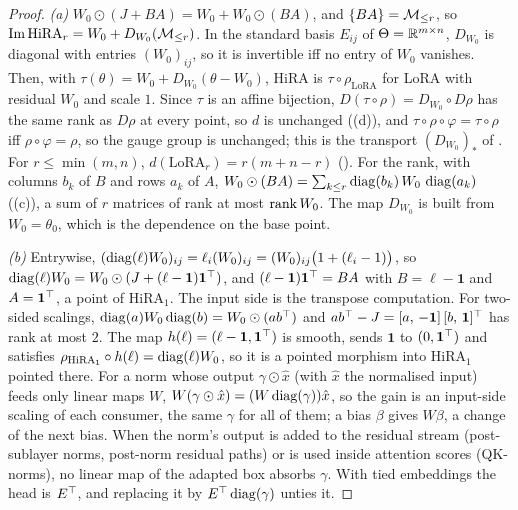 \begin{proof}
\emph{(a)} $W_0\odot(J+BA)=W_0+W_0\odot(BA)$, and $\{BA\}=\mathcal{M}_{\le r}$, so $\operatorname{Im}\mathrm{HiRA}_r=W_0+D_{W_0}(\mathcal{M}_{\le r})$. In the standard
basis $E_{ij}$ of $\Theta=\mathbb{R}^{m\times n}$, $D_{W_0}$ is diagonal with entries $(W_0)_{ij}$, so it is invertible iff no entry of
$W_0$ vanishes. Then, with $\tau(\theta)=W_0+D_{W_0}(\theta-W_0)$, HiRA is $\tau\circ\rho_{\mathrm{LoRA}}$ for LoRA with residual
$W_0$ and scale $1$. Since $\tau$ is an affine bijection, $D(\tau\circ\rho)=D_{W_0}\circ D\rho$ has the same rank as $D\rho$ at
every point, so $d$ is unchanged ((d)), and $\tau\circ\rho\circ\varphi=\tau\circ\rho$ iff $\rho\circ\varphi=\rho$,
so the gauge group is unchanged; this is the transport $(D_{W_0})_*$ of . For
$r\le\min(m,n)$, $d(\mathrm{LoRA}_r)=r(m+n-r)$ (). For the rank, with columns $b_k$ of $B$ and rows $a_k$ of
$A$, $W_0\odot(BA)=\sum_{k\le r}\operatorname{diag}(b_k)\,W_0\,\operatorname{diag}(a_k)$ ((c)), a sum of $r$ matrices of rank at most
$\operatorname{rank} W_0$. The map $D_{W_0}$ is built from $W_0=\theta_0$, which is the dependence on the base point.

\emph{(b)} Entrywise, $(\operatorname{diag}(\ell)W_0)_{ij}=\ell_i(W_0)_{ij}=(W_0)_{ij}\big(1+(\ell_i-1)\big)$, so
$\operatorname{diag}(\ell)W_0=W_0\odot(J+(\ell-\mathbf 1)\mathbf 1^{\top})$, and $(\ell-\mathbf 1)\mathbf 1^{\top}=BA$ with $B=\ell-\mathbf 1$ and
$A=\mathbf 1^{\top}$, a point of $\mathrm{HiRA}_1$. The input side is the transpose computation. For two-sided scalings,
$\operatorname{diag}(a)W_0\operatorname{diag}(b)=W_0\odot(ab^{\top})$ and $ab^{\top}-J=[a,\,-\mathbf 1]\,[b,\,\mathbf 1]^{\top}$ has rank at most $2$. The map
$h(\ell)=(\ell-\mathbf 1,\mathbf 1^{\top})$ is smooth, sends $\mathbf 1$ to $(0,\mathbf 1^{\top})$ and satisfies
$\rho_{\mathrm{HiRA}_1}\circ h(\ell)=\operatorname{diag}(\ell)W_0$, so it is a pointed morphism into $\mathrm{HiRA}_1$ pointed there.
For a norm whose output $\gamma\odot\hat x$ (with $\hat x$ the normalised input) feeds only linear maps $W$,
$W(\gamma\odot\hat x)=(W\operatorname{diag}(\gamma))\hat x$, so the gain is an input-side scaling of each consumer, the same $\gamma$ for
all of them; a bias $\beta$ gives $W\beta$, a change of the next bias. When the norm's output is added to the residual
stream (post-sublayer norms, post-norm residual paths) or is used inside attention scores (QK-norms), no linear map of the
adapted box absorbs $\gamma$. With tied embeddings the head is $E^{\top}$, and replacing it by $E^{\top}\operatorname{diag}(\gamma)$ unties it.


\end{proof}
